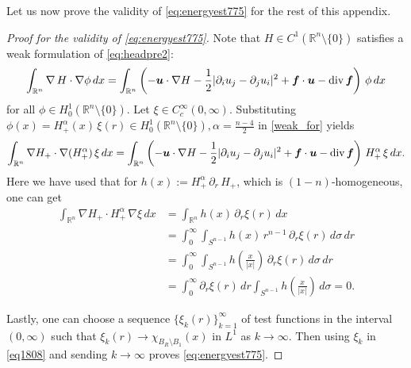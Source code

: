 \documentclass[12pt]{amsart}
\renewcommand{\div}{{\rm div \thinspace }}
\newcommand{\Bu}{{\boldsymbol{u}}}
\newcommand{\Bf}{{\boldsymbol{f}}}
\begin{document}
	Let us now prove the validity of \eqref{eq:energyest775} for the rest of this appendix.
	\begin{proof}[Proof for the validity of \eqref{eq:energyest775}]
		Note that $H\in C^1(\mathbb{R}^n \setminus \{0\})$ satisfies a weak formulation of \eqref{eq:headpre2}:
		\begin{align}
			\label{weak_for}
			\int_{\mathbb{R}^n} \nabla\, H \cdot \nabla \phi\, dx
			=
			\int_{\mathbb{R}^n}
			\left(
			-\Bu \cdot \nabla H - \frac12 |\partial_i u_j - \partial_j u_i|^2 + \Bf \cdot \Bu - \div \Bf 
			\right) \, \phi \, dx
		\end{align}
		for all $\phi\in H^1_0(\mathbb{R}^n\setminus \{0\})$.
		Let $\xi\in C_c^\infty (0,\infty)$.
		Substituting $\phi(x)= H_+^{\alpha}(x) \, \xi(r) \in H^1_0(\mathbb{R}^n\setminus \{0\}), \alpha=\frac{n-4}{2}$ in \eqref{weak_for} yields
		\begin{align}
			\label{eq1808}
			\int_{\mathbb{R}^n} 
			\nabla H_+ \cdot \nabla (H^\alpha_+ )\, \xi \, dx
			=
			\int_{\mathbb{R}^n} 
			\left(-\Bu \cdot \nabla H -\frac{1}{2} |\partial_i u_j - \partial_j u_i |^2 +\Bf\cdot \Bu -\div \Bf 
			\right)
			\, H_+^\alpha \, \xi \, dx.
		\end{align}
		Here we have used that for $h(x):=H^\alpha_+\, \partial_r \, H_+  $, which is $(1-n)$-homogeneous, one can get
		\begin{align*}
			\int_{\mathbb{R}^n}
			\nabla H_+ \cdot H_+^\alpha \, \nabla \xi \, dx
			&=
			\int_{\mathbb{R}^n} 
			h(x) \, \partial_r  \xi(r) \, dx
			\\
			&=
			\int_0^\infty \int _{S^{n-1}} h(x) \, r^{n-1} \, \partial_r \xi (r) \, d\sigma \, dr
			\\
			&=
			\int_0^\infty \int _{S^{n-1}} h\left( \frac{x}{|x|} \right) \, \partial_r \xi (r) \, d\sigma \, dr
			\\
			&=\int_0^\infty \partial_r \xi (r) \, dr
			\int _{S^{n-1}} h\left( \frac{x}{|x|} \right) \, d\sigma=0.
		\end{align*}
		
		Lastly, one can choose a sequence $\{\xi_k(r)\}_{k=1}^\infty$ of test functions in the interval $(0,\infty)$ such that $\xi_k(r) \to \chi_{B_R \setminus B_1}(x)$ in $L^1$ as $k\to\infty$. Then using $\xi_k$ in \eqref{eq1808} and sending $k\to\infty$  proves \eqref{eq:energyest775}.
	\end{proof}   
	
	
	
	
	
	
	
\end{document}

